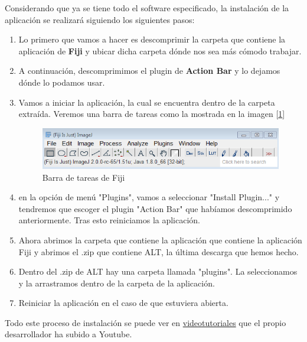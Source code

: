 Considerando que ya se tiene todo el software especificado,
la instalación de la aplicación se realizará siguiendo los siguientes pasos:
\begin{enumerate}
	\item Lo primero que vamos a hacer es descomprimir la carpeta que contiene la aplicación de \textbf{Fiji} y ubicar dicha carpeta dónde nos sea más cómodo trabajar.
	\item A continuación, descomprimimos el plugin de \textbf{Action Bar} y lo dejamos dónde lo podamos usar.
	\item Vamos a iniciar la aplicación, la cual se encuentra dentro de la carpeta extraída. Veremos una barra de tareas como la mostrada en la imagen [\ref{fig:barra_de_tareas}]
	\begin{figure}
		\centering
		\includegraphics[width=0.7\linewidth]{img/barra}
		\caption{Barra de tareas de Fiji}
		\label{fig:barra_de_tareas}
	\end{figure}
	
	\item en la opción de menú "Plugins", vamos a seleccionar "Install Plugin..."	y tendremos que escoger el plugin "Action Bar" que habíamos descomprimido anteriormente. Tras esto reiniciamos la aplicación.
	\item Ahora abrimos la carpeta que contiene la aplicación que contiene la aplicación Fiji y abrimos el .zip que contiene ALT, la última descarga que hemos hecho. 
	\item Dentro del .zip de ALT hay una carpeta llamada "plugins". La seleccionamos y la arrastramos dentro de la carpeta de la aplicación.
	\item Reiniciar la aplicación en el caso de que estuviera abierta.
\end{enumerate}
Todo este proceso de instalación se puede ver en \href{https://www.youtube.com/watch?v=G6ib950iDvQ}{videotutoriales} que el propio desarrollador ha subido a Youtube.
